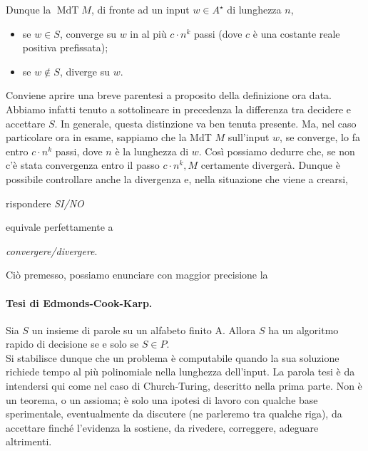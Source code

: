 Dunque la $\operatorname{MdT} M$, di fronte ad un input $w \in A^{\star}$ di
lunghezza $n$,

\begin{itemize}
    \item se $w \in S$, converge su $w$ in al più $c \cdot n^k$ passi (dove $c$
          è una costante reale positiva prefissata);
    \item se $w \notin S$, diverge su $w$.
\end{itemize}

Conviene aprire una breve parentesi a proposito della definizione ora data.
Abbiamo infatti tenuto a sottolineare in precedenza la differenza tra decidere e
accettare $S$. In generale, questa distinzione va ben tenuta presente. Ma, nel
caso particolare ora in esame, sappiamo che la MdT $M$ sull'input $w$, se
converge, lo fa entro $c \cdot n^k$ passi, dove $n$ è la lunghezza di $w$. Così
possiamo dedurre che, se non c'è stata convergenza entro il passo $c \cdot n^k,
    M$ certamente divergerà. Dunque è possibile controllare anche la divergenza e,
nella situazione che viene a crearsi,

\begin{center}
    rispondere \textit{SI/NO}
\end{center}

equivale perfettamente a

\begin{center}
    \textit{convergere/divergere}.
\end{center}

Ciò premesso, possiamo enunciare con maggior precisione la

\paragraph{Tesi di Edmonds-Cook-Karp.} Sia $S$ un insieme di parole su un
alfabeto finito A. Allora $S$ ha un algoritmo rapido di decisione se e solo se
$S \in P$.\\

Si stabilisce dunque che un problema è computabile quando la sua soluzione
richiede tempo al più polinomiale nella lunghezza dell'input. La parola tesi è
da intendersi qui come nel caso di Church-Turing, descritto nella prima parte.
Non è un teorema, o un assioma; è solo una ipotesi di lavoro con qualche base
sperimentale, eventualmente da discutere (ne parleremo tra qualche riga), da
accettare finché l'evidenza la sostiene, da rivedere, correggere, adeguare
altrimenti.

